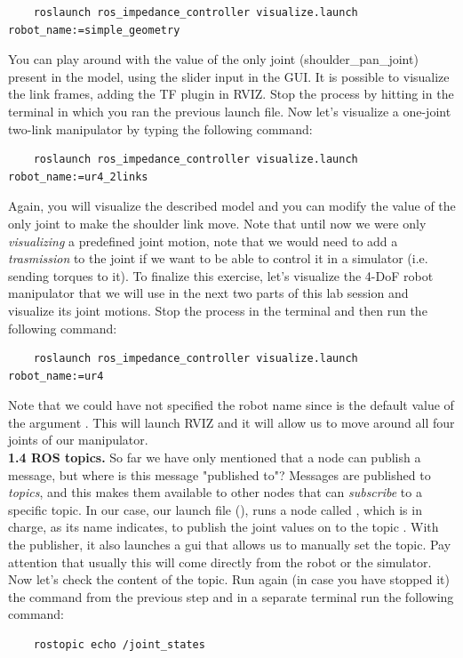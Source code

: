 \documentclass[11pt]{article}
\begin{document}
\footnotesize
\begin{verbatim}
	roslaunch ros_impedance_controller visualize.launch robot_name:=simple_geometry 
\end{verbatim}
\normalsize

 You can play around with the value of the only joint (shoulder\_pan\_joint) present in the model, using the slider input in the GUI. It is possible to visualize the link frames, adding the TF plugin in RVIZ. Stop the process by hitting  in the terminal in which you ran the previous launch file. 
Now let's visualize a one-joint two-link manipulator by typing the following command:
%
%
\footnotesize
\begin{verbatim}
	roslaunch ros_impedance_controller visualize.launch robot_name:=ur4_2links  
\end{verbatim} 
\normalsize
Again, you will visualize the described model and you can modify the value of the only joint to make the shoulder link move. Note that until now we were only \textit{visualizing} a predefined joint motion, note that we would need to add a \textit{trasmission} to the joint if we want to be able to control it in a simulator (i.e. sending torques to it). To finalize this exercise, let's visualize the 4-DoF robot manipulator that we will use in the next two parts of this lab session and visualize its joint motions. Stop the process in the terminal and then run the following command:
%
%
\footnotesize
\begin{verbatim}
	roslaunch ros_impedance_controller visualize.launch robot_name:=ur4  
\end{verbatim} 
\normalsize
Note that we could have not specified the robot name since  is the default value of the argument . This will launch RVIZ and it will allow us to move around all four joints of our manipulator.\\

\textbf{1.4 ROS topics.} So far we have only mentioned that a node can publish a message, but where is this message "published to"? Messages are published to \textit{topics}, and this makes them available to other nodes that can \textit{subscribe} to a specific topic. In our case, our launch file (), runs a node called , which is in charge, as its name indicates, to publish the joint values on to the topic . With the publisher, it also launches a gui that allows us to manually set the  topic. Pay attention that usually this  will come directly from the robot or the simulator. Now let's check the content of the  topic. Run again (in case you have stopped it) the command from the previous step and in a separate terminal run the following command:
%
\begin{verbatim}
	rostopic echo /joint_states
\end{verbatim}
\end{document}
